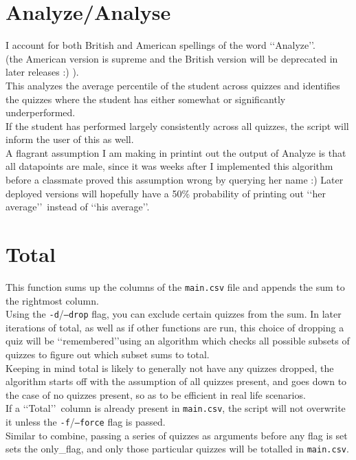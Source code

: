 \documentclass{article}
\begin{document}
    \section{Analyze/Analyse}
    I account for both British and American spellings of the word \lq\lq Analyze\rq\rq.\\ (the American version is supreme and the British version will be deprecated in later releases :) ).\\
    This analyzes the average percentile of the student across quizzes and identifies the quizzes where the student has either somewhat or significantly underperformed.\\
    If the student has performed largely consistently across all quizzes, the script will inform the user of this as well.\\
    A flagrant assumption I am making in printint out the output of Analyze is that all datapoints are male, since it was weeks after I implemented this algorithm before a classmate proved this assumption wrong by querying her name :)
    Later deployed versions will hopefully have a 50\% probability of printing out \lq\lq her average\rq\rq\ instead of \lq\lq his average\rq\rq.

    \section{Total}
    This function sums up the columns of the \texttt{main.csv} file and appends the sum to the rightmost column.\\
    Using the \texttt{-d}/\texttt{--drop} flag, you can exclude certain quizzes from the sum. In later iterations of total, as well as if other functions are run, this choice of dropping a quiz will be \lq\lq remembered\rq\rq using an algorithm which checks all possible subsets of quizzes to figure out which subset sums to total.\\
    Keeping in mind total is likely to generally not have any quizzes dropped, the algorithm starts off with the assumption of all quizzes present, and goes down to the case of no quizzes present, so as to be efficient in real life scenarios.\\
    If a \lq\lq Total\rq\rq\ column is already present in \texttt{main.csv}, the script will not overwrite it unless the \texttt{-f}/\texttt{--force} flag is passed.\\
    Similar to combine, passing a series of quizzes as arguments before any flag is set sets the only\_flag, and only those particular quizzes will be totalled in \texttt{main.csv}.\\
    
\end{document}
